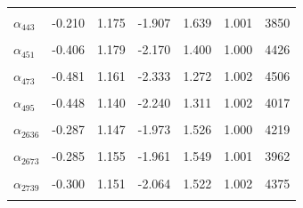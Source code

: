 \begin{longtable}{lrrrrrr}
\cellcolor{gray!10}{$\alpha_{440}$} & \cellcolor{gray!10}{-0.305} & \cellcolor{gray!10}{1.137} & \cellcolor{gray!10}{-2.000} & \cellcolor{gray!10}{1.470} & \cellcolor{gray!10}{1.001} & \cellcolor{gray!10}{4549}\\
$\alpha_{443}$ & -0.210 & 1.175 & -1.907 & 1.639 & 1.001 & 3850\\
\cellcolor{gray!10}{$\alpha_{446}$} & \cellcolor{gray!10}{-0.593} & \cellcolor{gray!10}{1.154} & \cellcolor{gray!10}{-2.455} & \cellcolor{gray!10}{1.121} & \cellcolor{gray!10}{1.001} & \cellcolor{gray!10}{3371}\\
$\alpha_{451}$ & -0.406 & 1.179 & -2.170 & 1.400 & 1.000 & 4426\\
\cellcolor{gray!10}{$\alpha_{453}$} & \cellcolor{gray!10}{-0.405} & \cellcolor{gray!10}{1.171} & \cellcolor{gray!10}{-2.217} & \cellcolor{gray!10}{1.417} & \cellcolor{gray!10}{1.002} & \cellcolor{gray!10}{4067}\\
$\alpha_{473}$ & -0.481 & 1.161 & -2.333 & 1.272 & 1.002 & 4506\\
\cellcolor{gray!10}{$\alpha_{474}$} & \cellcolor{gray!10}{-0.472} & \cellcolor{gray!10}{1.121} & \cellcolor{gray!10}{-2.241} & \cellcolor{gray!10}{1.251} & \cellcolor{gray!10}{1.002} & \cellcolor{gray!10}{4866}\\
$\alpha_{495}$ & -0.448 & 1.140 & -2.240 & 1.311 & 1.002 & 4017\\
\cellcolor{gray!10}{$\alpha_{2632}$} & \cellcolor{gray!10}{-0.314} & \cellcolor{gray!10}{1.128} & \cellcolor{gray!10}{-2.037} & \cellcolor{gray!10}{1.431} & \cellcolor{gray!10}{1.003} & \cellcolor{gray!10}{4486}\\
$\alpha_{2636}$ & -0.287 & 1.147 & -1.973 & 1.526 & 1.000 & 4219\\
\cellcolor{gray!10}{$\alpha_{2640}$} & \cellcolor{gray!10}{-0.177} & \cellcolor{gray!10}{1.173} & \cellcolor{gray!10}{-1.919} & \cellcolor{gray!10}{1.747} & \cellcolor{gray!10}{1.001} & \cellcolor{gray!10}{3690}\\
$\alpha_{2673}$ & -0.285 & 1.155 & -1.961 & 1.549 & 1.001 & 3962\\
\cellcolor{gray!10}{$\alpha_{2692}$} & \cellcolor{gray!10}{-0.624} & \cellcolor{gray!10}{1.182} & \cellcolor{gray!10}{-2.476} & \cellcolor{gray!10}{1.081} & \cellcolor{gray!10}{1.001} & \cellcolor{gray!10}{3432}\\
$\alpha_{2739}$ & -0.300 & 1.151 & -2.064 & 1.522 & 1.002 & 4375\\
\cellcolor{gray!10}{$\alpha_{2859}$} & \cellcolor{gray!10}{-0.902} & \cellcolor{gray!10}{1.321} & \cellcolor{gray!10}{-3.183} & \cellcolor{gray!10}{0.893} & \cellcolor{gray!10}{1.003} & \cellcolor{gray!10}{1406}\\

\end{longtable}
